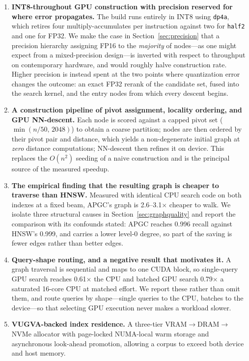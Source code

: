 \documentclass[11pt,twocolumn]{article}
\begin{document}
\begin{enumerate}[nosep]
    \item \textbf{INT8-throughout GPU construction with precision reserved for
    where error propagates.} The build runs entirely in INT8 using \texttt{dp4a},
    which retires four multiply-accumulates per instruction against two for
    \texttt{half2} and one for FP32. We make the case in
    Section~\ref{sec:precision} that a precision hierarchy assigning FP16 to the
    \emph{majority} of nodes---as one might expect from a mixed-precision
    design---is inverted with respect to throughput on contemporary hardware,
    and would roughly halve construction rate. Higher precision is instead
    spent at the two points where quantization error changes the outcome: an
    exact FP32 rerank of the candidate set, fused into the search kernel, and
    the entry nodes from which every descent begins.

    \item \textbf{A construction pipeline of pivot assignment, locality
    ordering, and GPU NN-descent.} Each node is scored against a capped pivot
    set ($\min(n/50,\,2048)$) to obtain a coarse partition; nodes are then
    ordered by their pivot pair and distance, which yields a non-degenerate
    initial graph at \emph{zero} distance computations; NN-descent then refines
    it on device. This replaces the $O(n^2)$ seeding of a naive construction and
    is the principal source of the measured speedup.

    \item \textbf{The empirical finding that the resulting graph is cheaper to
    traverse than HNSW.} Measured with identical CPU search code on both
    indexes at a fixed beam, APGC's graph is 2.6--3.1$\times$ cheaper to walk.
    We isolate three structural causes in Section~\ref{sec:graphquality} and
    report the comparison with its confounds stated: APGC reaches 0.996 recall
    against HNSW's 0.999, and carries a lower level-0 degree, so part of the
    saving is fewer edges rather than better edges.

    \item \textbf{Query-shape routing, and a negative result that motivates it.}
    A graph traversal is sequential and maps to one CUDA block, so single-query
    GPU search reaches 0.61$\times$ the CPU and batched GPU search 0.79$\times$ a
    saturated 16-core CPU at matched effort. We report these rather than omit
    them, and route queries by shape---single queries to the CPU, batches to the
    device---so that selecting GPU execution never makes a workload slower.

    \item \textbf{VUGVA-backed index residence.} A three-tier
    VRAM$\rightarrow$DRAM$\rightarrow$NVMe allocator with page-locked NUMA-local
    warm storage and asynchronous look-ahead promotion, allowing a corpus to
    exceed both device and host memory.
\end{enumerate}
\end{document}
